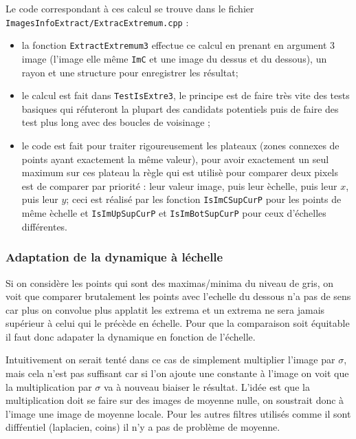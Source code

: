 Le code correspondant \`a ces calcul se trouve dans le fichier {\tt ImagesInfoExtract/ExtracExtremum.cpp} :


\begin{itemize}
   \item  la fonction {\tt ExtractExtremum3} effectue ce calcul en prenant en argument $3$ image
          (l'image elle m\^eme {\tt ImC} et une image du dessus et du dessous), un rayon et une 
          structure pour enregistrer les r\'esultat;


   \item le calcul est fait dans {\tt TestIsExtre3}, le principe est de faire tr\`es vite des tests
         basiques qui r\'efuteront la plupart des candidats potentiels puis de faire des test plus
         long avec des boucles de voisinage ;

    \item le code est fait pour traiter rigoureusement les plateaux (zones connexes de points ayant
          exactement la même valeur), pour avoir exactement un seul maximum sur ces plateau la r\`egle
          qui est utilis\`e pour comparer deux pixels est de comparer par priorit\'e : leur valeur image,
          puis leur \`echelle, puis leur $x$, puis leur $y$; ceci est r\'ealis\'e par les fonction
          {\tt IsImCSupCurP} pour les points de m\^eme \`echelle et {\tt IsImUpSupCurP} et {\tt IsImBotSupCurP}
          pour ceux d'\'echelles diff\'erentes.

\end{itemize}


\subsubsection{Adaptation de la dynamique \`a l\'echelle}

Si on consid\`ere les points qui sont des maximas/minima du niveau de gris,
on voit que comparer brutalement les points avec l'echelle du dessous n'a pas
de sens car plus on convolue plus applatit les extrema et un extrema ne sera
jamais sup\'erieur \`a celui qui le pr\'ec\`ede en \'echelle. Pour que la comparaison
soit \'equitable il faut donc adapater la dynamique en fonction de l'\'echelle.

Intuitivement on serait tent\'e dans ce cas de simplement multiplier l'image 
par  $\sigma$, mais cela n'est pas suffisant car si l'on ajoute une constante \`a l'image
on voit que la multiplication par $\sigma$ va \`a nouveau biaiser le r\'esultat. L'id\'ee
est que la multiplication doit se faire sur des images de moyenne nulle, on soustrait donc \`a
l'image une image de moyenne locale.  Pour les autres filtres utilis\'es comme il sont
diff\'rentiel (laplacien, coins) il n'y a pas de probl\`eme de moyenne.


